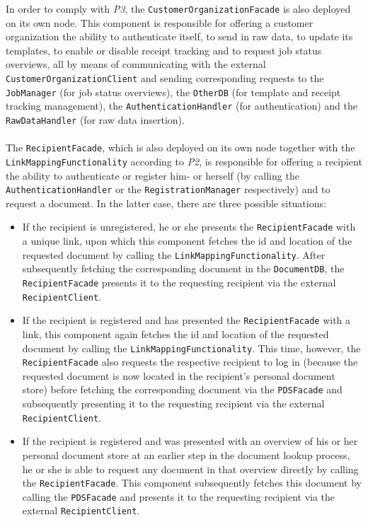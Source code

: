 \documentclass[a4paper,10pt]{article}
\begin{document}
In order to comply with \textit{P3}, the \texttt{CustomerOrganizationFacade} is also deployed on its own node. This component is responsible for offering a customer organization the ability to authenticate itself, to send in raw data, to update its templates, to enable or disable receipt tracking and to request job status overviews, all by means of communicating with the external \texttt{CustomerOrganizationClient} and sending corresponding requests to the \texttt{JobManager} (for job status overviews), the \texttt{OtherDB} (for template and receipt tracking management), the \texttt{AuthenticationHandler} (for authentication) and the \texttt{RawDataHandler} (for raw data insertion).\\\\
The \texttt{RecipientFacade}, which is also deployed on its own node together with the \texttt{LinkMappingFunctionality} according to \textit{P2}, is responsible for offering a recipient the ability to authenticate or register him- or herself (by calling the \texttt{AuthenticationHandler} or the \texttt{RegistrationManager} respectively) and to request a document. In the latter case, there are three possible situations:
\begin{itemize}
\item
If the recipient is unregistered, he or she presents the \texttt{RecipientFacade} with a unique link, upon which this component fetches the id and location of the requested document by calling the \texttt{LinkMappingFunctionality}. After subsequently fetching the corresponding document in the \texttt{DocumentDB}, the \texttt{RecipientFacade} presents it to the requesting recipient via the external \texttt{RecipientClient}.
\item
If the recipient is registered and has presented the \texttt{RecipientFacade} with a link, this component again fetches the id and location of the requested document by calling the \texttt{LinkMappingFunctionality}. This time, however, the \texttt{RecipientFacade} also requests the respective recipient to log in (because the requested document is now located in the recipient's personal document store) before fetching the corresponding document via the \texttt{PDSFacade} and subsequently presenting it to the requesting recipient via the external \texttt{RecipientClient}.
\item
If the recipient is registered and was presented with an overview of his or her personal document store at an earlier step in the document lookup process, he or she is able to request any document in that overview directly by calling the \texttt{RecipientFacade}. This component subsequently fetches this document by calling the \texttt{PDSFacade} and presents it to the requesting recipient via the external \texttt{RecipientClient}.
\end{itemize}
\end{document}
